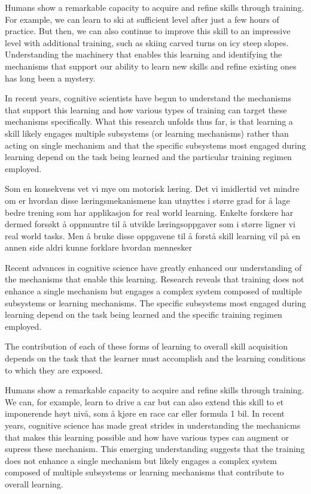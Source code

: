 Humans show a remarkable capacity to acquire and refine skills through training. For example, we can learn to ski at sufficient level after just a few hours of practice. But then, we can also continue to improve this skill to an impressive level with additional training, such as skiing carved turns on icy steep slopes. Understanding the machinery that enables this learning and identifying the mechanisms that support our ability to learn new skills and refine existing ones has long been a mystery. 

In recent years, cognitive scientists have begun to understand the mechanisms that support this learning and how various types of training can target these mechanisms specifically. What this research unfolds thus far, is that learning a skill likely engages multiple subsystems (or learning mechanisms) rather than acting on single mechanism and that the specific subsystems most engaged during learning depend on the task being learned and the particular training regimen employed. 


Som en konsekvens vet vi mye om motorisk læring. Det vi imidlertid vet mindre om er hvordan disse læringsmekanismene kan utnyttes i større grad for å lage bedre trening som har applikasjon for real world learning. Enkelte forskere har dermed forsøkt å oppmuntre til å utvikle læringsoppgaver som i større ligner vi real world tasks. Men å bruke disse oppgavene til å forstå skill learning vil på en annen side aldri kunne forklare hvordan mennesker






Recent advances in cognitive science have greatly enhanced our understanding of the mechanisms that enable this learning. Research reveals that training does not enhance a single mechanism but engages a complex system composed of multiple subsystems or learning mechanisms. The specific subsystems most engaged during learning depend on the task being learned and the specific training regimen employed. 



The contribution of each of these forms of learning to overall skill acquisition depends on the task that the learner must accomplish and the learning conditions to which they are exposed.





Humans show a remarkable capacity to acquire and refine skills through training. We can, for example, learn to drive a car but can also extend this skill to et imponerende høyt nivå, som å kjøre en race car eller formula 1 bil. In recent years, cognitive science has made great strides in understanding the mechanicms that makes this learning possible and how have various types can augment or supress these mechanism. This emerging understanding suggests that the training does not enhance a single mechanism but likely engages a complex system composed of multiple subsystems or learning mechanisms that contribute to overall learning. 



